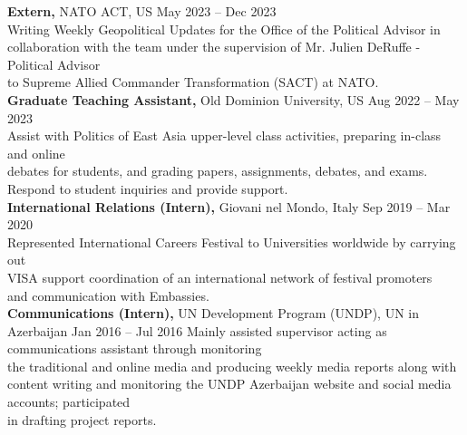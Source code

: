 \documentclass[10pt, a4paper]{article}
\begin{document}
\vspace{5pt} \hspace{-18pt}
\noindent \textbf{Extern,} NATO ACT, US \hfill May 2023 – Dec 2023\\
{\small Writing Weekly Geopolitical Updates for the Office of the Political Advisor in \\ collaboration with the team under the supervision of Mr. Julien DeRuffe - Political Advisor \\ to Supreme Allied Commander Transformation (SACT) at NATO.
\vspace{5pt} \hspace{-6pt}
}\\
\textbf{Graduate Teaching Assistant,} Old Dominion University, US \hfill Aug 2022 – May 2023\\
{\small Assist with Politics of East Asia upper-level class activities, preparing in-class and online \\ debates for students, and grading papers, assignments, debates, and exams. \\ Respond to student inquiries and provide support. 
\vspace{5pt} \hspace{-6pt}
}\\
\textbf{International Relations (Intern),} Giovani nel Mondo, Italy \hfill Sep 2019 – Mar 2020 
\\
{\small Represented International Careers Festival to Universities worldwide by carrying out \\ VISA  support coordination of an international network of festival promoters \\ and communication with  Embassies.
\vspace{5pt} \hspace{-6pt}
} \\
\textbf{Communications (Intern),} UN Development Program (UNDP), UN in Azerbaijan  \hspace{2cm} Jan 2016 – Jul 2016 
{\small Mainly assisted supervisor acting as communications assistant through monitoring \\ the traditional and online media and producing weekly media reports along with \\ content writing and monitoring the UNDP Azerbaijan website and social media accounts; participated \\ in drafting project reports.} \\
\end{document}
